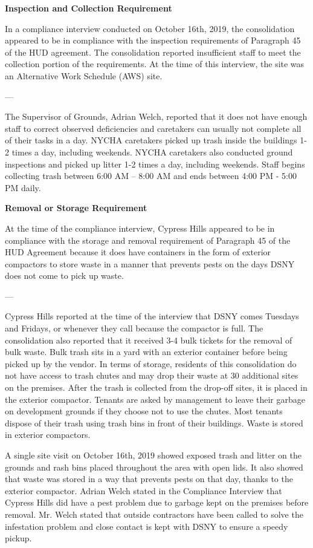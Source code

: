 

\textbf{Inspection and Collection Requirement}

In a compliance interview conducted on October 16th, 2019, the consolidation appeared to be in compliance with the inspection requirements of Paragraph 45 of the HUD agreement. The consolidation reported insufficient staff to meet the collection portion of the requirements. At the time of this interview, the site was an Alternative Work Schedule (AWS) site. 

---

The Supervisor of Grounds, Adrian Welch, reported that it does not have enough staff to correct observed deficiencies and caretakers can usually not complete all of their tasks in a day. NYCHA caretakers picked up trash inside the buildings 1-2 times a day, including weekends. NYCHA caretakers also conducted ground inspections and picked up litter 1-2 times a day, including weekends. Staff begins collecting trash between 6:00 AM -- 8:00 AM and ends between 4:00 PM - 5:00 PM daily. 

\textbf{Removal or Storage Requirement}

At the time of the compliance interview, Cypress Hills appeared to be in compliance with the storage and removal requirement of Paragraph 45 of the HUD Agreement because it does have containers in the form of exterior compactors to store waste in a manner that prevents pests on the days DSNY does not come to pick up waste.

---

Cypress Hills reported at the time of the interview that DSNY comes Tuesdays and Fridays, or whenever they call because the compactor is full. The consolidation also reported that it received 3-4 bulk tickets for the removal of bulk waste. Bulk trash sits in a yard with an exterior container before being picked up by the vendor. In terms of storage, residents of this consolidation do not have access to trash chutes and may drop their waste at 30 additional sites on the premises. After the trash is collected from the drop-off sites, it is placed in the exterior compactor. Tenants are asked by management to leave their garbage on development grounds if they choose not to use the chutes. Most tenants dispose of their trash using trash bins in front of their buildings. Waste is stored in exterior compactors. 

A single site visit on October 16th, 2019 showed exposed trash and litter on the grounds and rash bins placed throughout the area with open lids. It also showed that waste was stored in a way that prevents pests on that day, thanks to the exterior compactor. Adrian Welch stated in the Compliance Interview that Cypress Hills did have a pest problem due to garbage kept on the premises before removal. Mr. Welch stated that outside contractors have been called to solve the infestation problem and close contact is kept with DSNY to ensure a speedy pickup.

